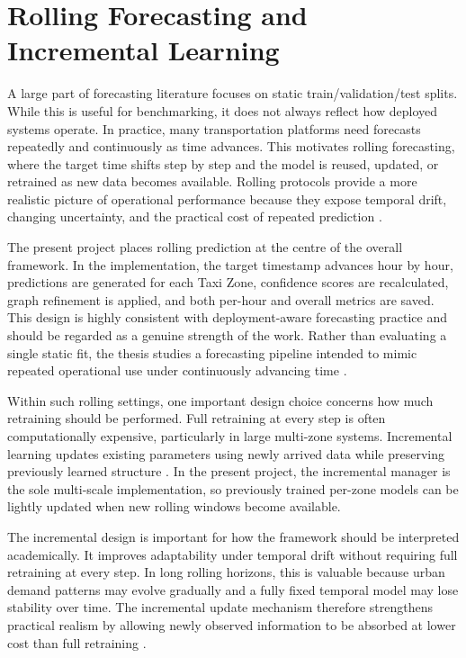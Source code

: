 \documentclass[12pt,a4paper]{report}
\begin{document}
\section{Rolling Forecasting and Incremental Learning}

A large part of forecasting literature focuses on static train/validation/test splits. While this is useful for benchmarking, it does not always reflect how deployed systems operate. In practice, many transportation platforms need forecasts repeatedly and continuously as time advances. This motivates rolling forecasting, where the target time shifts step by step and the model is reused, updated, or retrained as new data becomes available. Rolling protocols provide a more realistic picture of operational performance because they expose temporal drift, changing uncertainty, and the practical cost of repeated prediction \cite{hewamalage2022pitfalls,cerqueira2020evaluating}.

The present project places rolling prediction at the centre of the overall framework. In the implementation, the target timestamp advances hour by hour, predictions are generated for each Taxi Zone, confidence scores are recalculated, graph refinement is applied, and both per-hour and overall metrics are saved. This design is highly consistent with deployment-aware forecasting practice and should be regarded as a genuine strength of the work. Rather than evaluating a single static fit, the thesis studies a forecasting pipeline intended to mimic repeated operational use under continuously advancing time \cite{hewamalage2022pitfalls}.

Within such rolling settings, one important design choice concerns how much retraining should be performed. Full retraining at every step is often computationally expensive, particularly in large multi-zone systems. Incremental learning updates existing parameters using newly arrived data while preserving previously learned structure \cite{cavalcante2024review,lu2023incremental}. In the present project, the incremental manager is the sole multi-scale implementation, so previously trained per-zone models can be lightly updated when new rolling windows become available.

The incremental design is important for how the framework should be interpreted academically. It improves adaptability under temporal drift without requiring full retraining at every step. In long rolling horizons, this is valuable because urban demand patterns may evolve gradually and a fully fixed temporal model may lose stability over time. The incremental update mechanism therefore strengthens practical realism by allowing newly observed information to be absorbed at lower cost than full retraining \cite{hewamalage2022pitfalls,cavalcante2024review}.
\end{document}
